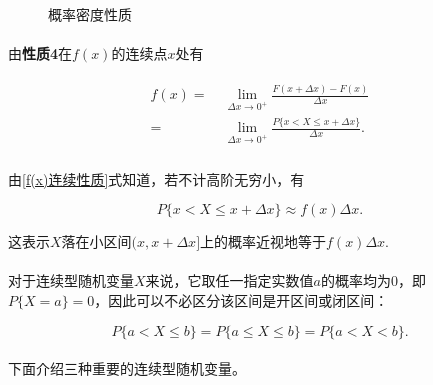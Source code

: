 \begin{figure}[h]
\centering
  \begin{subfigure}[t]{0.48\linewidth}
    \centering
      
  \end{subfigure}
  \begin{subfigure}[t]{0.48\linewidth}
    \centering
      
  \end{subfigure}
  \caption{概率密度性质}
  \label{概率密度性质}
\end{figure}

\paragraph{}
由\textbf{性质4}在$f(x)$的连续点$x$处有

\begin{align}
  \label{f(x)连续性质}
  \begin{split}
    f(x) =&\; \lim_{\Delta x \to 0^+}\frac{F(x+\Delta x) - F(x)}{\Delta x} \\
    =&\; \lim_{\Delta x \to 0^+}\frac{P\{x < X \leq x + \Delta x\}}{\Delta x}.
  \end{split}
\end{align}

\paragraph{}
由\eqref{f(x)连续性质}式知道，若不计高阶无穷小，有

\begin{equation}
  P\{x < X \leq x + \Delta x\} \approx f(x)\Delta x.
\end{equation}

这表示$X$落在小区间$(x, x+\Delta x]$上的概率近视地等于$f(x)\Delta x$.

\paragraph{}
对于连续型随机变量$X$来说，它取任一指定实数值$a$的概率均为$0$，即$P\{X=a\}=0$，因此可以不必区分该区间是开区间或闭区间：

\begin{equation}
  P\{a < X \leq b\} = P\{a \leq X \leq b\} = P\{a < X < b\}.
\end{equation}

\paragraph{}
下面介绍三种重要的连续型随机变量。


